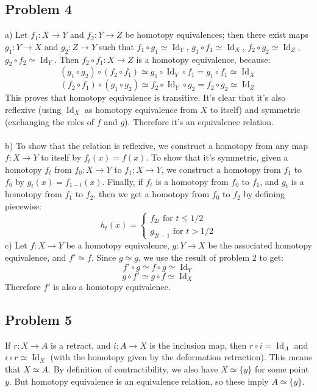 \documentclass[12 pt]{article}
\DeclareMathOperator{\id}{Id}
\begin{document}
\subsection*{Problem 4}
a) Let $f_1: X \to Y$ and $f_2:Y \to Z$ be homotopy equivalences; then there exist maps $g_1 : Y \to X$ and $g_2 : Z \to Y$ such that $f_1 \circ g_1 \simeq \id_Y$, $g_1 \circ f_1 \simeq \id_X$, $f_2 \circ g_2 \simeq \id_Z$, $g_2 \circ f_2 \simeq \id_Y$. Then $f_2 \circ f_1 : X \to Z$ is a homotopy equivalence, because:
\[       (g_1 \circ g_2) \circ (f_2 \circ f_1)  \simeq g_1 \circ \id_Y \circ f_1 = g_1 \circ f_1 \simeq \id_X      \]
\[        (f_2 \circ f_1) \circ (g_1 \circ g_2) \simeq f_2  \circ \id_Y \circ g_2 = f_2 \circ g_2 \simeq \id_Z   \]
This proves that homotopy equivalence is transitive. It's clear that it's also reflexive (using $\id_X$ as homotopy equivalence from $X$ to itself) and symmetric (exchanging the roles of $f$ and $g$). Therefore it's an equivalence relation.
\\
\\
b) To show that the relation is reflexive, we construct a homotopy from any map $f: X \to Y$ to itself by $f_t(x) = f(x)$. To show that it's symmetric, given a homotopy $f_t$ from $f_0:X\to Y$ to $f_1 : X \to Y$, we construct a homotopy from $f_1$ to $f_0$ by $g_t (x) = f_{1-t}(x)$. Finally, if $f_t$ is a homotopy from $f_0$ to $f_1$, and $g_t$ is a homotopy from $f_1$ to $f_2$, then we get a homotopy from $f_0$ to $f_2$ by defining piecewise:
\[    h_t(x) = \left\{ \begin{array} {c}  f_{2t} \text{ for } t\leq 1/2  \\ g_{2t-1} \text{ for } t>1/2 \end{array} \right.   \]
c) Let $f : X \to Y$ be a homotopy equivalence, $g: Y \to X$ be the associated homotopy equivalence, and $f' \simeq f$. Since $g\simeq g$, we use the result of problem 2 to get:
\[    f' \circ g \simeq f \circ g \simeq \id_Y      \]
\[    g \circ f' \simeq g\circ f \simeq \id_X          \]
Therefore $f'$ is also a homotopy equivalence.


\subsection*{Problem 5}
If $r : X \to A$ is a retract, and $i : A \to X$ is the inclusion map, then $r\circ i = \id_A$ and $i \circ r \simeq \id_X$ (with the homotopy given by the deformation retraction). This means that $X \simeq A$. By definition of contractibility, we also have $X \simeq \{y\}$ for some point $y$. But homotopy equivalence is an equivalence relation, so these imply $A \simeq \{y\}$.
\end{document}
